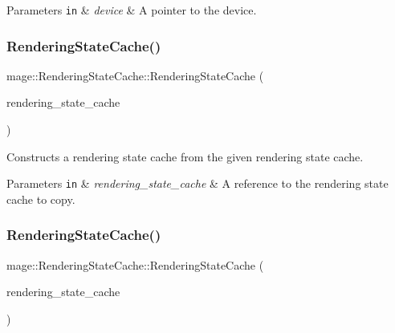 \begin{DoxyParams}[1]{Parameters}
\mbox{\tt in}  & {\em device} & A pointer to the device. \\
\hline
\end{DoxyParams}
\hypertarget{structmage_1_1_rendering_state_cache_a47c0f5527ce10ca9b6a059946efda239}{}\label{structmage_1_1_rendering_state_cache_a47c0f5527ce10ca9b6a059946efda239} 
\subsubsection{\texorpdfstring{Rendering\+State\+Cache()}{RenderingStateCache()}\hspace{0.1cm}{\footnotesize\ttfamily [2/3]}}
{\footnotesize\ttfamily mage\+::\+Rendering\+State\+Cache\+::\+Rendering\+State\+Cache (\begin{DoxyParamCaption}\item[{const \hyperlink{structmage_1_1_rendering_state_cache}{Rendering\+State\+Cache} \&}]{rendering\+\_\+state\+\_\+cache }\end{DoxyParamCaption})\hspace{0.3cm}{\ttfamily [delete]}}

Constructs a rendering state cache from the given rendering state cache.


\begin{DoxyParams}[1]{Parameters}
\mbox{\tt in}  & {\em rendering\+\_\+state\+\_\+cache} & A reference to the rendering state cache to copy. \\
\hline
\end{DoxyParams}
\hypertarget{structmage_1_1_rendering_state_cache_aacdb082df6180f0fe6a76f54b7b2f776}{}\label{structmage_1_1_rendering_state_cache_aacdb082df6180f0fe6a76f54b7b2f776} 
\subsubsection{\texorpdfstring{Rendering\+State\+Cache()}{RenderingStateCache()}\hspace{0.1cm}{\footnotesize\ttfamily [3/3]}}
{\footnotesize\ttfamily mage\+::\+Rendering\+State\+Cache\+::\+Rendering\+State\+Cache (\begin{DoxyParamCaption}\item[{\hyperlink{structmage_1_1_rendering_state_cache}{Rendering\+State\+Cache} \&\&}]{rendering\+\_\+state\+\_\+cache }\end{DoxyParamCaption})\hspace{0.3cm}{\ttfamily [default]}}

